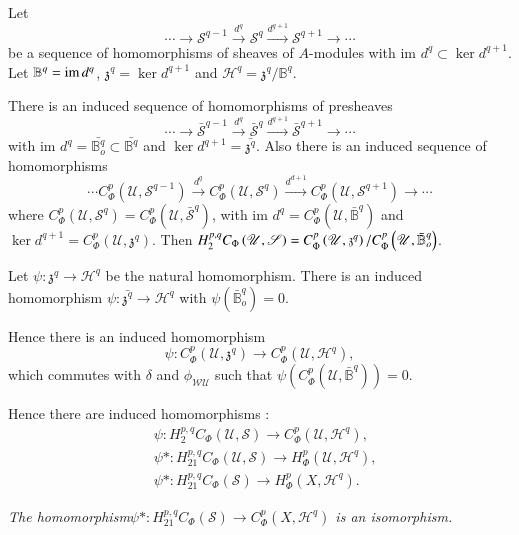 Let\pageoriginale 
$$
\cdots \to \mathscr{S}^{q-1} \xrightarrow{d^q} \mathscr{S}^q
\xrightarrow{d^{q+1}} \mathscr{S}^{q+1} \to \cdots 
$$
be a sequence of homomorphisms of sheaves of $A$-modules with im $d^q
\subset \ker d^{q+1}$. Let $\mathbb{B}^q = \operatorname{im} d^q$, $\mathfrak{z}^q =
\ker d^{q+1}$ and $\mathscr{H}^q = \mathfrak{z}^q/ \mathbb{B}^q$. 

There is an induced sequence of homomorphisms of presheaves   
$$ 
\cdots \to \bar{\mathscr{S}}^{q-1} \xrightarrow{d^q}
\bar{\mathscr{S}}^q\xrightarrow{d^{q+1}} \bar{\mathscr{S}}^{q+1} \to
\cdots 
$$
with im $d^q = \bar{\mathbb{B}^q_o} \subset \bar{\mathbb{B}^q}$ and
$\ker d^{q+1}= \bar{\mathfrak{z}^q}$. Also there is an induced
sequence of homomorphisms  
$$ 
\cdots C^p_{\Phi} \left(\mathscr{U},\mathscr{S}^{q-1} \right) \xrightarrow{d^q}
C^p_{\Phi} \left(\mathscr{U},\mathscr{S}^{q} \right) \xrightarrow
{d^{d+1}} C^p_{\Phi} \left(\mathscr{U},\mathscr{S}^{q+1} \right) \to
\cdots  
$$
where $C^p_{\Phi}\left(\mathscr{U},\mathscr{S}^{q} \right)=
C^p_{\Phi} \left(\mathscr{U},\bar{\mathscr{S}}^{q} \right)$, with im
$d^q =C^p_{\Phi}\left(\mathscr{U},\bar{\mathbb{B}}^{q}\right)$ and
$\ker d^{q+1} = C^p_{\Phi}\left(\mathscr{U},\mathfrak{z}^{q}
\right)$. Then $H^{p,q}_2 C_{\Phi} \left(\mathscr{U},\mathscr{S}
\right)= C^p_{\Phi} \left(\mathscr{U},\mathfrak{z}^{q} \right)/  
C^p_{\Phi}\break \left(\mathscr{U},\bar{\mathbb{B}}^{q}_o \right)$. 

Let $\psi : \mathfrak{z}^q \to \mathscr{H}^q$ be the natural
homomorphism. There is an induced homomorphism $\psi :
\bar{\mathfrak{z}^q} \to \mathscr{H}^q$ with $\psi (\bar{\mathbb{B}}^q_o
)=0$. 

Hence there is an induced homomorphism
$$
\psi :  C^p_{\Phi}(\mathscr{U},\mathfrak{z}^{q}) \to
C^p_{\Phi}(\mathscr{U},\mathscr{H}^{q}), 
$$
which commutes with $\delta$ and $\phi_{\mathscr{W}\mathscr{U}}$ such
that $\psi (C^p_{\Phi}(\mathscr{U},\bar{\mathbb{B}}^{q}))=0$. 

Hence there are induced homomorphisms :  
\begin{align*}
& \psi : H^{p,q}_2 C_{\Phi}(\mathscr{U},\mathscr{S}) \to
  C^p_{\Phi}(\mathscr{U},\mathscr{H}^{q}),\\ 
& \psi* : H^{p,q}_{21} C_{\Phi}(\mathscr{U},\mathscr{S}) \to
  H^p_{\Phi}(\mathscr{U},\mathscr{H}^{q}),\\ 
&\psi* : H^{p,q}_{21} C_{\Phi}(\mathscr{S}) \to
  H^p_{\Phi}(X,\mathscr{H}^{q}). 
\end{align*}

\textit{The homomorphism\pageoriginale $\psi* : H^{p,q}_{21} C_{\Phi}(\mathscr{S})
  \to C^p_{\Phi}(X,\mathscr{H}^{q})$ is an isomorphism.} 

